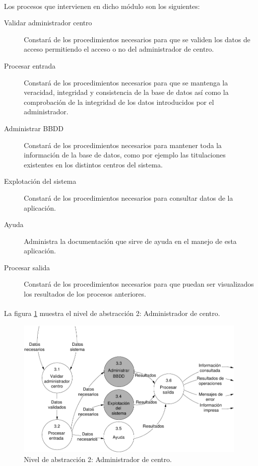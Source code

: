 \paragraph{}Los procesos que intervienen en dicho módulo son los siguientes:

\begin{description}
 \item[Validar administrador centro] Constará de los procedimientos necesarios
      para que se validen los datos de acceso permitiendo el acceso o no del
      administrador de centro.
 \item[Procesar entrada] Constará de los procedimientos necesarios para que se
      mantenga la veracidad, integridad y consistencia de la base de datos así
      como la comprobación de la integridad de los datos introducidos por el
      administrador.
 \item[Administrar BBDD] Constará de los procedimientos necesarios para mantener
      toda la información de la base de datos, como por ejemplo las titulaciones
      existentes en los distintos centros del sistema.
 \item[Explotación del sistema]  Constará de los procedimientos necesarios para
      consultar datos de la aplicación.
 \item[Ayuda] Administra la documentación que sirve de ayuda en el manejo de
      esta aplicación.
 \item[Procesar salida] Constará de los procedimientos necesarios para que
      puedan ser visualizados los resultados de los procesos anteriores.
\end{description}

\paragraph{}La figura \ref{diagramaNivel2-AdmCentro} muestra el nivel de
abstracción 2: Administrador de centro.

  \begin{figure}[!ht]
    \begin{center}
      \includegraphics[]{08.Analisis_Funcional/8.2.DFDs/Niveles/Nivel2/Diagramas/nivel2-AdmCentro.pdf}
      \caption{Nivel de abstracción 2: Administrador de centro.}
      \label{diagramaNivel2-AdmCentro}
    \end{center}
  \end{figure}
